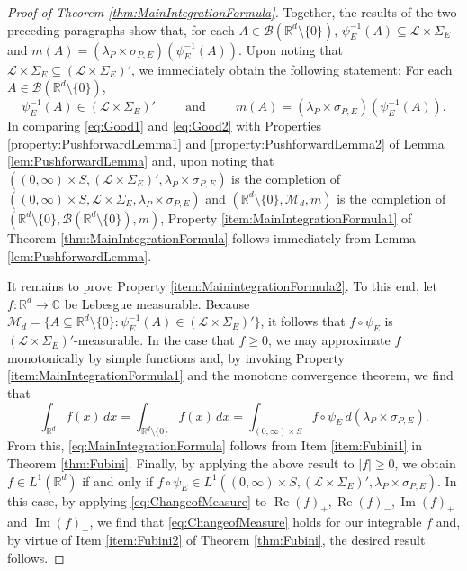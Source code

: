 \documentclass[11pt]{article}
\renewcommand\Re{\operatorname{Re}}%
\renewcommand\Im{\operatorname{Im}}
\begin{document}
\begin{proof}[Proof of Theorem \ref{thm:MainIntegrationFormula}]
Together, the results of the two preceding paragraphs show that, for each $A\in\mathcal{B}(\mathbb{R}^d\setminus\{0\})$, $\psi_E^{-1}(A)\subseteq \mathcal{L}\times\Sigma_E$ and $m(A)=(\lambda_P\times\sigma_{P,E})(\psi_E^{-1}(A))$. Upon noting that $\mathcal{L}\times\Sigma_E\subseteq (\mathcal{L}\times\Sigma_E)'$, we immediately obtain the following statement: For each $A\in\mathcal{B}(\mathbb{R}^d\setminus\{0\})$,
\begin{equation}\label{eq:Good2}
\psi_E^{-1}(A)\in (\mathcal{L}\times\Sigma_E)'\hspace{1cm}\mbox{and}\hspace{1cm}m(A)=(\lambda_P\times\sigma_{P,E})(\psi_E^{-1}(A)).
\end{equation}
In comparing \eqref{eq:Good1} and \eqref{eq:Good2} with Properties \ref{property:PushforwardLemma1} and \ref{property:PushforwardLemma2} of Lemma \ref{lem:PushforwardLemma} and, upon noting that $((0,\infty)\times S,(\mathcal{L}\times\Sigma_E)',\lambda_P\times\sigma_{P,E})$ is the completion of $((0,\infty)\times S,\mathcal{L}\times\Sigma_E,\lambda_P\times\sigma_{P,E})$ and $(\mathbb{R}^d\setminus\{0\},\mathcal{M}_d,m)$ is the completion of $(\mathbb{R}^d\setminus\{0\},\mathcal{B}(\mathbb{R}^d\setminus\{0\}),m)$, Property \ref{item:MainIntegrationFormula1} of Theorem \ref{thm:MainIntegrationFormula} follows immediately from Lemma \ref{lem:PushforwardLemma}.

It remains to prove Property \ref{item:MainintegrationFormula2}. To this end, let $f:\mathbb{R}^d\to\mathbb{C}$ be Lebesgue measurable. Because $\mathcal{M}_d=\{A\subseteq \mathbb{R}^d\setminus\{0\}:\psi_E^{-1}(A)\in(\mathcal{L}\times\Sigma_E)'\}$, it follows that $f\circ\psi_E$ is $(\mathcal{L}\times\Sigma_E)'$-measurable. In the case that $f\geq 0$, we may approximate $f$ monotonically by simple functions and, by invoking Property \ref{item:MainIntegrationFormula1} and the monotone convergence theorem, we find that
\begin{equation}\label{eq:ChangeofMeasure}
\int_{\mathbb{R}^d}f(x)\,dx=\int_{\mathbb{R}^d\setminus \{0\}}f(x)\,dx=\int_{(0,\infty)\times S}f\circ \psi_E\, d(\lambda_P\times\sigma_{P,E}).
\end{equation}
From this, \eqref{eq:MainIntegrationFormula} follows from Item \ref{item:Fubini1} in Theorem \ref{thm:Fubini}. Finally, by applying the above result to $|f|\geq 0$, we obtain $f\in L^1(\mathbb{R}^d)$ if and only if $f\circ \psi_E\in L^1((0,\infty)\times S,(\mathcal{L}\times\Sigma_E)',\lambda_P\times\sigma_{P,E})$. In this case, by applying \eqref{eq:ChangeofMeasure} to $\Re(f)_+,\Re(f)_-,\Im(f)_+$ and $\Im(f)_-$, we find that \eqref{eq:ChangeofMeasure} holds for our integrable $f$ and, by virtue of Item  \ref{item:Fubini2} of Theorem \ref{thm:Fubini}, the desired result follows.
\end{proof}
\end{document}
